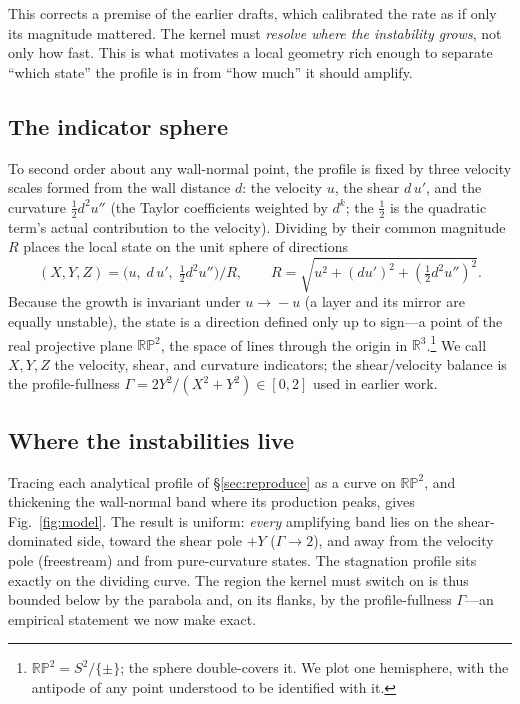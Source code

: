 This corrects a premise of the earlier drafts, which calibrated the rate as if
only its magnitude mattered. The kernel must \emph{resolve where the
instability grows}, not only how fast. This is what motivates a local geometry
rich enough to separate ``which state'' the profile is in from ``how much'' it
should amplify.

\subsection{The indicator sphere}\label{sec:sphere}
To second order about any wall-normal point, the profile is fixed by three
velocity scales formed from the wall distance $d$: the velocity $u$, the shear
$d\,u'$, and the curvature $\tfrac12 d^2 u''$ (the Taylor coefficients weighted
by $d^{k}$; the $\tfrac12$ is the quadratic term's actual contribution to the
velocity). Dividing by their common magnitude $R$ places the local state on
the unit sphere of directions
\begin{equation}
  (X,Y,Z) = \big(u,\; d\,u',\; \tfrac12 d^2 u''\big)\big/R,
  \qquad R=\sqrt{u^2+(d u')^2+(\tfrac12 d^2u'')^2}.
  \label{eq:indicators}
\end{equation}
Because the growth is invariant under $u\!\to\!-u$ (a layer and its mirror are
equally unstable), the state is a direction defined only up to sign---a point
of the real projective plane $\mathbb{RP}^2$, the space of lines through the
origin in $\mathbb{R}^3$.\footnote{$\mathbb{RP}^2=S^2/\{\pm\}$; the sphere
double-covers it. We plot one hemisphere, with the antipode of any point
understood to be identified with it.} We call $X,Y,Z$ the velocity, shear, and
curvature indicators; the shear/velocity balance is the profile-fullness
$\Gamma = 2Y^2/(X^2+Y^2)\in[0,2]$ used in earlier work.

\subsection{Where the instabilities live}\label{sec:live}
Tracing each analytical profile of \S\ref{sec:reproduce} as a curve on
$\mathbb{RP}^2$, and thickening the wall-normal band where its production
peaks, gives Fig.~\ref{fig:model}. The result is uniform: \emph{every}
amplifying band lies on the shear-dominated side, toward the shear pole $+Y$
($\Gamma\!\to\!2$), and away from the velocity pole (freestream) and from
pure-curvature states. The stagnation profile sits exactly on the dividing
curve. The region the kernel must switch on is thus bounded below by the
parabola and, on its flanks, by the profile-fullness $\Gamma$---an empirical
statement we now make exact.

